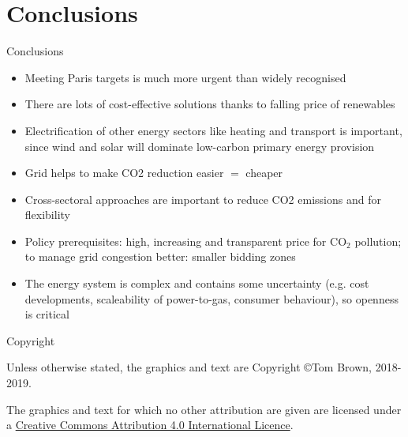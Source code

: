 \documentclass[10pt,aspectratio=169,dvipsnames]{beamer}
\def\co2{CO${}_2$}
\let\olditem\item
\renewcommand{\item}{%
\olditem\vspace{5pt}}
\begin{document}
\section{Conclusions}

\begin{frame}{Conclusions}

  \begin{itemize}
    \item Meeting \alert{Paris targets} is much more urgent than widely recognised

    \item There are \alert{lots of cost-effective solutions} thanks to falling price of renewables

    \item \alert{Electrification of other energy sectors} like heating
      and transport is important, since wind and solar will dominate
      low-carbon primary energy provision

    \item \alert{Grid helps} to make CO2 reduction easier $=$ cheaper


    \item \alert{Cross-sectoral} approaches are important to reduce
      CO2 emissions \alert{and} for flexibility

    \item \alert{Policy prerequisites}: high, increasing and
      transparent \alert{price for \co2{} pollution}; to manage grid
      congestion better: \alert{smaller bidding zones}

    \item The energy system is complex and contains some uncertainty
      (e.g. cost developments, scaleability of power-to-gas, consumer behaviour), so
      \alert{openness is critical}

  \end{itemize}

\end{frame}


\begin{frame}{Copyright}


  Unless otherwise stated, the graphics and text are Copyright \copyright Tom Brown, 2018-2019.


  The graphics and text for which no other attribution are given are licensed under a
  \href{https://creativecommons.org/licenses/by/4.0/}{Creative Commons
  Attribution 4.0 International Licence}.

  \begin{center}\ccby\end{center}

\end{frame}
\end{document}
